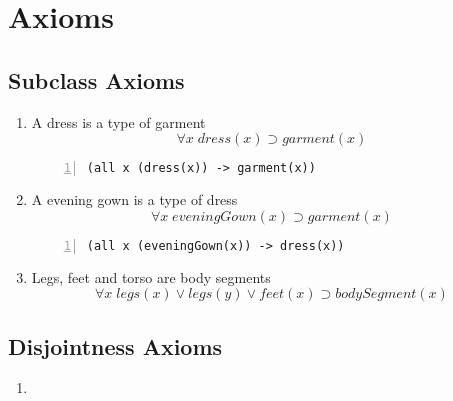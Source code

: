 \documentclass[paper=a4, fontsize=11pt]{scrartcl} %
\numberwithin{equation}{section} %
\numberwithin{figure}{section} %
\numberwithin{table}{section} %
\begin{document}
\section{Axioms}
\subsection{Subclass Axioms}
\begin{enumerate}

	\item A dress is a type of garment
	\begin{equation*}
		\forall x \; dress(x) \supset garment(x)
	\end{equation*}
	\begin{Verbatim}[frame=lines,gobble=2,numbers=left]
		(all x (dress(x)) -> garment(x))
	\end{Verbatim}
	

	\item A evening gown is a type of dress
	\begin{equation*}
		\forall x \; eveningGown(x) \supset garment(x)
	\end{equation*}
	\begin{Verbatim}[frame=lines,gobble=2,numbers=left]
		(all x (eveningGown(x)) -> dress(x))
	\end{Verbatim}


\item Legs, feet and torso are body segments
\begin{equation*}
	\forall x \; legs(x) \lor legs(y) \lor feet(x) \supset bodySegment(x)
\end{equation*}

\end{enumerate}
\clearpage

\subsection{Disjointness Axioms}
\begin{enumerate}
	\item
\end{enumerate}
\clearpage
\end{document}
